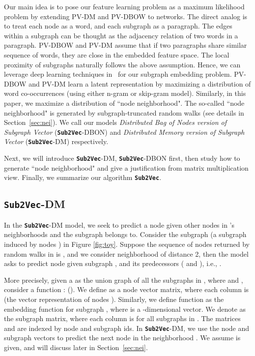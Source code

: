 \documentclass[sigconf]{acmart}
\newcommand{\alg}{{\bf {\tt Sub2Vec}}\xspace}
\begin{document}
Our main idea is to pose our feature learning problem as a maximum likelihood problem by extending PV-DM and PV-DBOW  to  networks.  The direct analog is to treat each node as a word, and each subgraph as a paragraph. The edges within a subgraph can be thought as the adjacency relation of two words in a paragraph.  
PV-DBOW and PV-DM assume  that if two paragraphs share similar sequence of words, they are close in the embedded feature space. The local proximity of subgraphs naturally follows the above assumption. 
Hence, we can leverage deep learning techniques in~\cite{le2014distributed} for our subgraph embedding problem. PV-DBOW and PV-DM learn a latent representation by maximizing a distribution of word co-occurrences (using either n-gram or skip-gram model). Similarly, in this paper, we maximize a distribution of ``node neighborhood". The so-called  ``node neighborhood" is generated by subgraph-truncated random walks (see details in Section~\ref{sec:nei}). We call our models  \emph{Distributed Bag of Nodes version of Subgraph Vector }(\alg-DBON) and \emph{Distributed Memory version of Subgraph Vector} (\alg-DM) respectively. 

Next, we will introduce \alg-DM, \alg-DBON first, then study how to generate ``node neighborhood" and give a justification from matrix multiplication view. Finally, we summarize our algorithm \alg.

\subsection{\alg-DM}
\label{sub:svdm}

In the \alg-DM model, we seek to predict a node  given other nodes in 's neighborhoods and the subgraph  belongs to.  Consider the subgraph  (a subgraph induced by nodes )  in Figure \ref{fig:toy}. Suppose the sequence of nodes returned by random walks in  is , and we consider neighborhood of distance 2, then the model asks to predict node  given subgraph , and its predecessors ( and ), i.e., .
 
 More precisely, given a  as the union graph of all the subgraphs in , where  and , consider a function :  (). 
 We define  as a  node vector matrix, where each column is  (the vector representation of nodes ). 
  Similarly, we define function  as the embedding function for subgraph , where  is a -dimensional vector. We denote  as the  subgraph matrix, where each column is  for all subgraphs in .
  The matrices  and  are indexed by node and subgraph ids. In \alg-DM, we use the node and subgraph vectors to predict the next node in the neighborhood . We assume  is given, and will discuss   later in Section~\ref{sec:nei}.  
\end{document}

